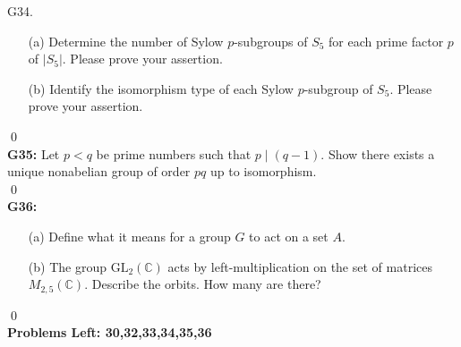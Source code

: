 G34. \begin{itemize}
	\item[(a)] Determine the number of Sylow $p$-subgroups of $S_{5}$ for each prime factor $p$ of $\left|S_{5}\right|$. Please prove your assertion.
	\item[(b)] Identify the isomorphism type of each Sylow $p$-subgroup of $S_{5}$. Please prove your assertion.
\end{itemize}
\soln
\qed\\


\textbf{G35:} Let $p<q$ be prime numbers such that $p \mid(q-1)$. Show there exists a unique nonabelian group of order $p q$ up to isomorphism.\\
\soln
\qed\\


\textbf{G36:}
\begin{itemize}
	\item[(a)] Define what it means for a group $G$ to act on a set $A$.
	\item[(b)] The group $\mathrm{GL}_{2}(\mathbb{C})$ acts by left-multiplication on the set of matrices $M_{2,5}(\mathbb{C})$. Describe the orbits. How many are there?
\end{itemize}
\soln
\qed\\


\textbf{Problems Left: 30,32,33,34,35,36}